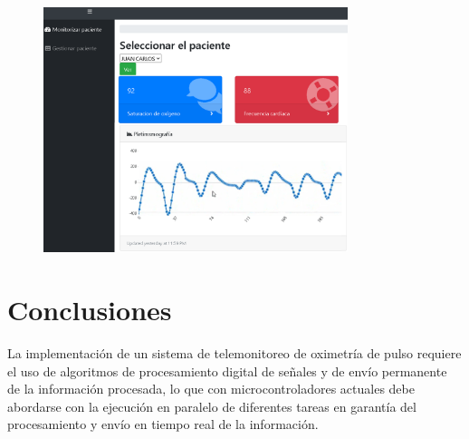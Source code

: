 \documentclass[journal]{IEEEtran}
\begin{document}
\begin{figure}[!h]
	\centering
	\includegraphics[width=3.5in]{resultado_aplicacion_web.png}
	\caption{
	\color{green}{		
		Prueba funcional de aplicación Web, la señal corresponde a la pletismografia en infrarrojo; los recuadros en azul y rojo presentan el valor de SpO2 y la frecuencia cardíaca, respectivamente}}
	\label{resultado_aplicacion_web}
\end{figure}


%		
%			
%	
%			




\section{Conclusiones}


La implementación de un sistema de telemonitoreo de oximetría de pulso requiere el uso de algoritmos de procesamiento digital de señales y de envío permanente de la información procesada, lo que con microcontroladores actuales debe abordarse con la ejecución en paralelo de diferentes tareas en garantía del procesamiento y envío en tiempo real de la información.
\end{document}
